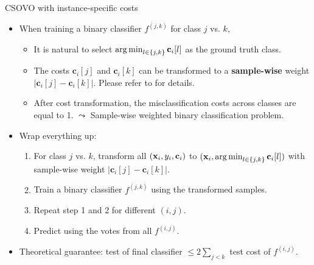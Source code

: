 \documentclass[11pt,compress,t,notes=noshow, xcolor=table]{beamer}
\newcommand{\cv}{\mathbf{c}}    %
\begin{document}
\begin{vbframe}{CSOVO with instance-specific costs}
    \footnotesize
    \begin{itemize}
        \item When training a binary classifier $f^{(j, k)}$ for class $j$ vs. $k$,
        \begin{itemize}
            \footnotesize
            \item It is natural to select $\argmin_{l \in \{j, k\}} \cv_i[l]$ as the ground truth class.
            \vspace{5pt}
            
            \item The costs $\cv_i[j]$ and $\cv_i[k]$ can be transformed to a \textbf{sample-wise} weight $|\cv_i[j] - \cv_i[k]|$. Please refer to \href{https://proceedings.mlr.press/v39/lin14.pdf}{} for details.
            \vspace{5pt}

            \item After cost transformation, the misclassification costs across classes are equal to 1. $\leadsto$ Sample-wise weighted binary classification problem.
            \vspace{5pt}
        \end{itemize}

    \item Wrap everything up:
    \begin{enumerate}
        \footnotesize
        \item For class $j$ vs. $k$, transform all $(\xv_i, y_i, \cv_i)$ to $(\xv_i, \argmin_{l \in \{j, k\}} \cv_i[l])$ with sample-wise weight $|\cv_i[j] - \cv_i[k]|$.
        \vspace{5pt}
        
        \item Train a binary classifier $f^{(j, k)}$ using the transformed samples.
        \vspace{5pt}
        
        \item Repeat step 1 and 2 for different $(i, j)$.
        \vspace{5pt}
        
        \item Predict using the votes from all $f^{(i, j)}$.
    \end{enumerate}
    \vspace{5pt}

    \item Theoretical guarantee: test of final classifier $\leq 2\sum_{j < k}$ test cost of $f^{(i, j)}$. 
    \end{itemize}
\end{vbframe}
\end{document}
